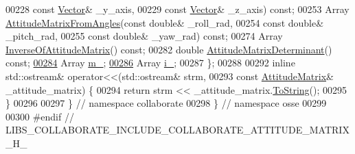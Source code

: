 \begin{DoxyCode}
00228                                \textcolor{keyword}{const} \hyperlink{classosse_1_1collaborate_1_1_vector}{Vector}& \_y\_axis,
00229                                \textcolor{keyword}{const} \hyperlink{classosse_1_1collaborate_1_1_vector}{Vector}& \_z\_axis) \textcolor{keyword}{const};
00253   Array \hyperlink{classosse_1_1collaborate_1_1_attitude_matrix_a4c9220dfc49995fadcfce4f9f71ee33d}{AttitudeMatrixFromAngles}(\textcolor{keyword}{const} \textcolor{keywordtype}{double}& \_roll\_rad,
00254                                  \textcolor{keyword}{const} \textcolor{keywordtype}{double}& \_pitch\_rad,
00255                                  \textcolor{keyword}{const} \textcolor{keywordtype}{double}& \_yaw\_rad) \textcolor{keyword}{const};
00274   Array \hyperlink{classosse_1_1collaborate_1_1_attitude_matrix_afd089287837320e37d29552e894505f4}{InverseOfAttitudeMatrix}() \textcolor{keyword}{const};
00282   \textcolor{keywordtype}{double} \hyperlink{classosse_1_1collaborate_1_1_attitude_matrix_aaa2fd8ea9b1aac6ba462bf0a24b28774}{AttitudeMatrixDeterminant}() \textcolor{keyword}{const};
\hyperlink{classosse_1_1collaborate_1_1_attitude_matrix_a4431d81104329938ee7ba9dfc0b156e3}{00284}   Array \hyperlink{classosse_1_1collaborate_1_1_attitude_matrix_a4431d81104329938ee7ba9dfc0b156e3}{m\_};
\hyperlink{classosse_1_1collaborate_1_1_attitude_matrix_a5c07ebb15fdf22ee7d47c0055068217a}{00286}   Array \hyperlink{classosse_1_1collaborate_1_1_attitude_matrix_a5c07ebb15fdf22ee7d47c0055068217a}{i\_};
00287 \};
00288 
00292 \textcolor{keyword}{inline} std::ostream& operator<<(std::ostream& strm,
00293                                 \textcolor{keyword}{const} \hyperlink{classosse_1_1collaborate_1_1_attitude_matrix}{AttitudeMatrix}& \_attitude\_matrix) \{
00294   \textcolor{keywordflow}{return} strm << \_attitude\_matrix.\hyperlink{classosse_1_1collaborate_1_1_attitude_matrix_af8945f566ab44170c579b16662004bd2}{ToString}();
00295 \}
00296 
00297 \}  \textcolor{comment}{// namespace collaborate}
00298 \}  \textcolor{comment}{// namespace osse}
00299 
00300 \textcolor{preprocessor}{#endif  // LIBS\_COLLABORATE\_INCLUDE\_COLLABORATE\_ATTITUDE\_MATRIX\_H\_}
\end{DoxyCode}
